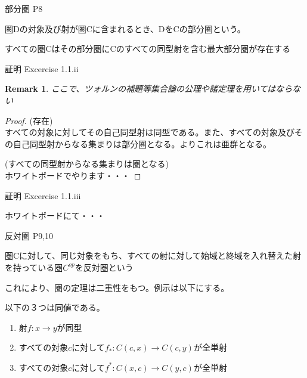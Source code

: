 \documentclass[unicode,12pt,aspectratio=169]{beamer}
\newtheorem*{remark}{Remark}
\begin{document}
\begin{frame}{部分圏 P8}
    \begin{tcolorbox}
        \begin{definition}
            圏Dの対象及び射が圏Cに含まれるとき、DをCの部分圏という。
        \end{definition}
        \begin{theorem}
            すべての圏Cはその部分圏にCのすべての同型射を含む最大部分圏が存在する
        \end{theorem}
    \end{tcolorbox}
\end{frame}
\begin{frame}{証明 Excercise 1.1.ii}
    \begin{tcolorbox}
        \begin{remark}
            ここで、ツォルンの補題等集合論の公理や諸定理を用いてはならない
        \end{remark}
        \begin{proof}
            (存在)\\
            すべての対象に対してその自己同型射は同型である。また、すべての対象及びその自己同型射からなる集まりは部分圏となる。よりこれは亜群となる。

            (すべての同型射からなる集まりは圏となる)\\
            ホワイトボードでやります・・・
        \end{proof}
    \end{tcolorbox}
\end{frame}
\begin{frame}{証明 Excercise 1.1.iii}
    \begin{tcolorbox}
        ホワイトボードにて・・・
    \end{tcolorbox}
\end{frame}
\begin{frame}{反対圏 P9,10}
    \begin{tcolorbox}
        \begin{definition}
            圏Cに対して、同じ対象をもち、すべての射に対して始域と終域を入れ替えた射を持っている圏$C^{op}$を反対圏という
        \end{definition}
        これにより、圏の定理は二重性をもつ。例示は以下にする。
        \begin{theorem}
            以下の３つは同値である。
            \begin{enumerate}
                \item 射$f:x \rightarrow y$が同型
                \item すべての対象$c$に対して$f_*:C(c,x) \rightarrow C(c,y)$が全単射
                \item すべての対象$c$に対して$f^*:C(x,c) \rightarrow C(y,c)$が全単射
            \end{enumerate}
        \end{theorem}
    \end{tcolorbox}
\end{frame}
\end{document}
